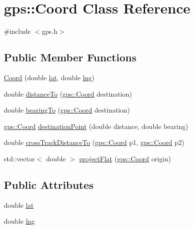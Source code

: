 \hypertarget{classgps_1_1Coord}{}\section{gps\+:\+:Coord Class Reference}
\label{classgps_1_1Coord}


{\ttfamily \#include $<$gps.\+h$>$}

\subsection*{Public Member Functions}
\begin{DoxyCompactItemize}
\item 
\hyperlink{classgps_1_1Coord_afcc45fae837b48cd7d9bd545c4dc574c}{Coord} (double \hyperlink{classgps_1_1Coord_a17cbbd7580a83c42f650b8f93e14d98e}{lat}, double \hyperlink{classgps_1_1Coord_abca98aaabe2dc3cf50ebdd687c2f47e8}{lng})
\item 
double \hyperlink{classgps_1_1Coord_a335589710eec94e6062323ef5c8994ab}{distance\+To} (\hyperlink{classgps_1_1Coord}{gps\+::\+Coord} destination)
\item 
double \hyperlink{classgps_1_1Coord_a3d3d160c28334979d220dce4112e087d}{bearing\+To} (\hyperlink{classgps_1_1Coord}{gps\+::\+Coord} destination)
\item 
\hyperlink{classgps_1_1Coord}{gps\+::\+Coord} \hyperlink{classgps_1_1Coord_ae76a605c81049d648d4e39ee0f56ff7b}{destination\+Point} (double distance, double bearing)
\item 
double \hyperlink{classgps_1_1Coord_a0efb59b2c1fa68551f118bcea3733593}{cross\+Track\+Distance\+To} (\hyperlink{classgps_1_1Coord}{gps\+::\+Coord} p1, \hyperlink{classgps_1_1Coord}{gps\+::\+Coord} p2)
\item 
std\+::vector$<$ double $>$ \hyperlink{classgps_1_1Coord_ac2e47c5d6d9a3d54a4086e8003fc7e9a}{project\+Flat} (\hyperlink{classgps_1_1Coord}{gps\+::\+Coord} origin)
\end{DoxyCompactItemize}
\subsection*{Public Attributes}
\begin{DoxyCompactItemize}
\item 
double \hyperlink{classgps_1_1Coord_a17cbbd7580a83c42f650b8f93e14d98e}{lat}
\item 
double \hyperlink{classgps_1_1Coord_abca98aaabe2dc3cf50ebdd687c2f47e8}{lng}
\end{DoxyCompactItemize}



